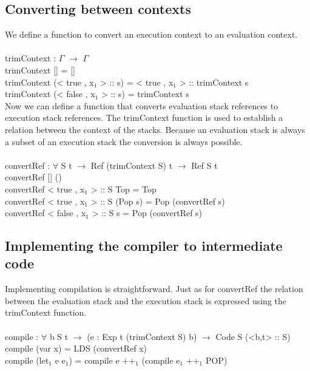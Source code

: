 \documentclass[paper=a4, fontsize=11pt]{scrartcl} %
\numberwithin{equation}{section} %
\numberwithin{figure}{section} %
\numberwithin{table}{section} %
\begin{document}
\subsection{Converting between contexts}

We define a function to convert an execution context to an evaluation context.\\
\ttfamily
\\
trimContext : $\Gamma$ $\rightarrow$ $\Gamma$\\
trimContext [] = []\\
trimContext (< true , x$_1$ > :: s) = < true , x$_1$ > :: trimContext s\\
trimContext (< false , x$_1$ > :: s) = trimContext s\\

\normalfont
Now we can define a function that converts evaluation stack references to execution stack references. The \ttfamily trimContext \normalfont function is used to establish a relation between the context of the stacks. Because an evaluation stack is always a subset of an execution stack the conversion is always possible.\\
\ttfamily
\\
convertRef : $\forall$ {S t} $\rightarrow$ Ref (trimContext S) t $\rightarrow$ Ref S t\\
convertRef {[]} ()\\
convertRef {< true , x$_1$ > :: S} Top = Top\\
convertRef {< true , x$_1$ > :: S} (Pop s) = Pop (convertRef s)\\
convertRef {< false , x$_1$ > :: S} s = Pop (convertRef s)\\

\normalfont

\subsection{Implementing the compiler to intermediate code}
Implementing compilation is straightforward. Just as for \ttfamily convertRef \normalfont the relation between the evaluation stack and the execution stack is expressed using the \ttfamily trimContext \normalfont function. \\
\\
\ttfamily
compile : $\forall$ {b S t} $\rightarrow$ (e : Exp t (trimContext S) b) $\rightarrow$ Code S (<b,t> :: S)\\
compile (var x) = LDS (convertRef x)\\
compile (let$_1$ e e$_1$) = compile e ++$_1$ (compile e$_1$ ++$_1$ POP)\\
\normalfont
\end{document}
